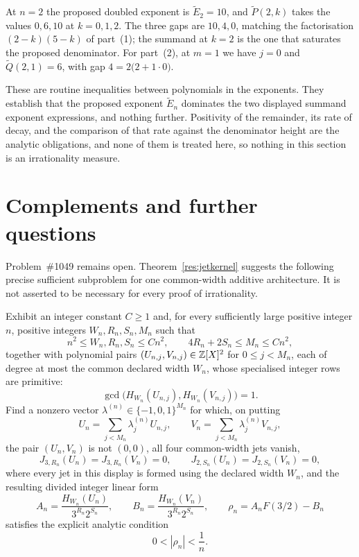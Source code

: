 \documentclass[11pt]{article}
\begin{document}
\begin{example}\label{ex:pade}
At $n=2$ the proposed doubled exponent is $\widetilde{E}_2=10$, and
$\widetilde{P}(2,k)$ takes the values $0,6,10$ at $k=0,1,2$.  The three gaps are
$10,4,0$, matching the factorisation $(2-k)(5-k)$ of part~(1); the summand at
$k=2$ is the one that saturates the proposed denominator.  For part~(2), at
$m=1$ we have $j=0$ and $\widetilde{Q}(2,1)=6$, with gap
$4=2\bigl(2+1\cdot0\bigr)$.
\end{example}

These are routine inequalities between polynomials in the exponents.  They
establish that the proposed exponent $\widetilde{E}_n$ dominates the two
displayed summand exponent expressions, and nothing further.  Positivity of the remainder, its rate of
decay, and the comparison of that rate against the denominator height are the
analytic obligations, and none of them is treated here, so nothing in this
section is an irrationality measure.

\section{Complements and further questions}\label{sec:open}

Problem~\#1049 remains open.  Theorem~\ref{res:jetkernel} suggests the following precise sufficient
subproblem for one common-width additive architecture.  It is not asserted to
be necessary for every proof of irrationality.

\begin{problem}\label{prob:kernel}
Exhibit an integer constant \(C\ge1\) and, for every sufficiently large
positive integer \(n\), positive integers \(W_n,R_n,S_n,M_n\) such that
\[
 n^2\le W_n,R_n,S_n\le Cn^2,
 \qquad 4R_n+2S_n\le M_n\le Cn^2,
\]
together with polynomial pairs
\((U_{n,j},V_{n,j})\in\mathbb{Z}[X]^2\) for \(0\le j<M_n\), each of degree at most
the common declared width \(W_n\), whose specialised integer rows are
primitive:
\[
 \gcd\!\bigl(H_{W_n}(U_{n,j}),H_{W_n}(V_{n,j})\bigr)=1.
\]
Find a nonzero vector
\(\lambda^{(n)}\in\{-1,0,1\}^{M_n}\) for which, on putting
\[
 U_n=\sum_{j<M_n}\lambda^{(n)}_jU_{n,j},
 \qquad V_n=\sum_{j<M_n}\lambda^{(n)}_jV_{n,j},
\]
the pair \((U_n,V_n)\) is not \((0,0)\), all four common-width jets vanish,
\[
 J_{3,R_n}(U_n)=J_{3,R_n}(V_n)=0,
 \qquad J_{2,S_n}(U_n)=J_{2,S_n}(V_n)=0,
\]
where every jet in this display is formed using the declared width \(W_n\),
and the resulting divided integer linear form
\[
 A_n=\frac{H_{W_n}(U_n)}{3^{R_n}2^{S_n}},
 \qquad
 B_n=\frac{H_{W_n}(V_n)}{3^{R_n}2^{S_n}},
 \qquad
 \rho_n=A_nF(3/2)-B_n
\]
satisfies the explicit analytic condition
\[
 0<|\rho_n|<\frac1n.
\]
\end{problem}
\end{document}
